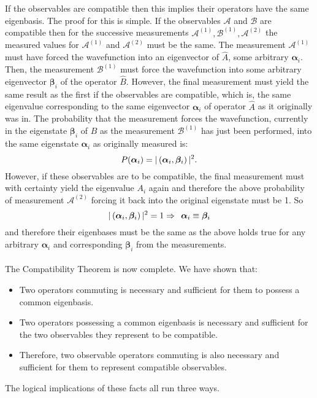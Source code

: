 \\\\
If the observables are compatible then this implies their operators have the same eigenbasis. The proof for this is simple. If the observables $\mathcal{A}$ and $\mathcal{B}$ are compatible then for the successive measurements $\mathcal{A}^{(1)},\mathcal{B}^{(1)},\mathcal{A}^{(2)}$ the measured values for $\mathcal{A}^{(1)}$ and $\mathcal{A}^{(2)}$ must be the same. The measurement $\mathcal{A}^{(1)}$ must have forced the wavefunction into an eigenvector of $\hat{A}$, some arbitrary $\bm{\alpha}_{i}$. Then, the measurement $\mathcal{B}^{(1)}$ must force the wavefunction into some arbitrary eigenvector $\bm{\beta}_{i}$ of the operator $\hat{B}$. However, the final measurement must yield the same result as the first if the observables are compatible, which is, the same eigenvalue corresponding to the same eigenvector $\bm{\alpha}_{i}$ of operator $\hat{A}$ as it originally was in. The probability that the measurement forces the wavefunction, currently in the eigenstate $\bm{\beta}_{i}$ of $\hat{B}$ as the measurement $\mathcal{B}^{(1)}$ has just been performed, into the same eigenstate $\bm{\alpha}_{i}$ as originally measured is:
$$
P(\bm{\alpha}_{i})=|\left(\bm{\alpha}_{i},\bm{\beta}_{i}\right)|^2.
$$
However, if these observables are to be compatible, the final measurement must with certainty yield the eigenvalue $A_{i}$ again and therefore the above probability of measurement $\mathcal{A}^{(2)}$ forcing it back into the original eigenstate must be 1. So 
$$
|\left(\bm{\alpha}_{i},\bm{\beta}_{i}\right)|^2=1 \Rightarrow\:\: \bm{\alpha}_{i}\equiv\bm{\beta}_{i}
$$
and therefore their eigenbases must be the same as the above holds true for any arbitrary $\bm{\alpha}_{i}$ and corresponding $\bm{\beta}_{i}$ from the measurements.
\\\\
The Compatibility Theorem is now complete. We have shown that:
\begin{itemize}
    \item Two operators commuting is necessary and sufficient for them to possess a common eigenbasis.
    \item Two operators possessing a common eigenbasis is necessary and sufficient for the two observables they represent to be compatible.
    \item Therefore, two observable operators commuting is also necessary and sufficient for them to represent compatible observables.
\end{itemize}
The logical implications of these facts all run three ways.
